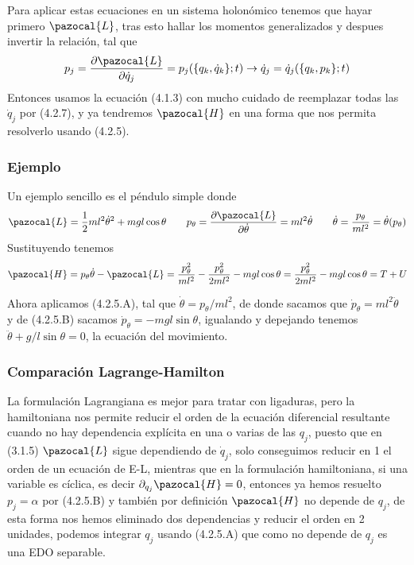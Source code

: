 Para aplicar estas ecuaciones en un sistema holonómico tenemos que hayar primero $\pazocal{L}$, tras esto hallar los momentos generalizados y despues invertir la relación, tal que
\begin{equation} \label{4.2.7}
    p_j = \frac{\partial \pazocal{L}}{\partial \dot{q}_j}=p_j(\{q_k,\dot{q}_k\};t) \rightarrow \dot{q}_j = \dot{q}_j(\{q_k,p_k\};t)
\end{equation} 
Entonces usamos la ecuación (4.1.3) con mucho cuidado de reemplazar todas las $\dot{q}_j$ por (4.2.7), y ya tendremos $\pazocal{H}$ en una forma que nos permita resolverlo usando (4.2.5).
\vspace{-20pt}
\subsubsection{Ejemplo}
Un ejemplo sencillo es el péndulo simple donde 
\[\pazocal{L}=\frac{1}{2}ml^2\dot{\theta}^2+mgl\cos{\theta} \ \ \ \ \ \ p_\theta = \frac{\partial \pazocal{L}}{\partial \dot{\theta}}=ml^2\dot{\theta} \ \ \ \ \ \ \dot{\theta}=\frac{p_\theta}{ml^2}=\dot{\theta}(p_\theta)\]
Sustituyendo tenemos 
\[\pazocal{H}=p_\theta \dot{\theta} -\pazocal{L}=\frac{p_\theta^2}{ml^2} - \frac{p_\theta^2}{2ml^2}-mgl\cos\theta = \frac{p_\theta^2}{2ml^2}-mgl\cos\theta = T+U\]

Ahora aplicamos (4.2.5.A), tal que $\dot{\theta} = p_\theta/ml^2$, de donde sacamos que $\dot{p}_\theta=ml^2 \ddot{\theta}$ y de (4.2.5.B) sacamos $\dot{p}_\theta=-mgl\sin\theta$, igualando y depejando tenemos $\ddot{\theta} + g/l \sin\theta = 0$, la ecuación del movimiento.
\subsubsection{Comparación Lagrange-Hamilton}
La formulación Lagrangiana es mejor para tratar con ligaduras, pero la hamiltoniana nos permite reducir el orden de la ecuación diferencial resultante cuando no hay dependencia explícita en una o varias de las $q_j$, puesto que en (3.1.5) $  \pazocal{L}$ sigue dependiendo de $\dot{q}_j$, solo conseguimos reducir en 1 el orden de un ecuación de E-L, mientras que en la formulación hamiltoniana, si una variable es cíclica, es decir $\partial_{q_j}\pazocal{H}=0$, entonces ya hemos resuelto $p_j=\alpha$ por (4.2.5.B) y también por definición $\pazocal{H}$ no depende de $q_j$, de esta forma nos hemos eliminado dos dependencias y reducir el orden en 2 unidades, podemos integrar $q_j$ usando (4.2.5.A) que como no depende de $q_j$ es una EDO separable. 
